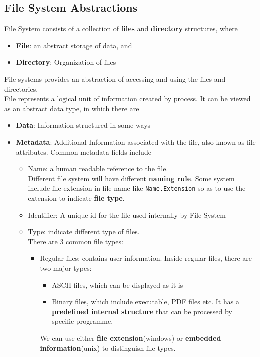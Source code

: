 \documentclass[12pt]{article}
\theoremstyle{definition}
\begin{document}
\subsection{File System Abstractions}
File System consists of a collection of \textbf{files} and \textbf{directory} structures, where
\begin{itemize}
  \item \textbf{File}: an abstract storage of data, and
  \item \textbf{Directory}: Organization of files
\end{itemize}
File systems provides an abstraction of accessing and using the files and directories.\\
File represents a logical unit of information created by process. It can be viewed as an abstract data type, in which there are
\begin{itemize}
  \item \textbf{Data}: Information structured in some ways
  \item \textbf{Metadata}: Additional Information associated with the file, also known as file attributes. Common metadata fields include 
  \begin{itemize}
    \item Name: a human readable reference to the file.\\Different file system will have different \textbf{naming rule}. Some system include file extension in file name like \texttt{Name.Extension} so as to use the extension to indicate \textbf{file type}.
    \item Identifier: A unique id for the file used internally by File System
    \item Type: indicate different type of files.\\
    There are 3 common file types:
    \begin{itemize}
      \item Regular files: contains user information. Inside regular files, there are two major types:
      \begin{itemize}
        \item ASCII files, which can be displayed as it is
        \item Binary files, which include executable, PDF files etc. It has a \textbf{predefined internal structure} that can be processed by specific programme.
      \end{itemize}
      We can use either \textbf{file extension}(windows) or \textbf{embedded information}(unix) to distinguish file types.

\end{itemize}
\end{itemize}
\end{itemize}
\end{document}
